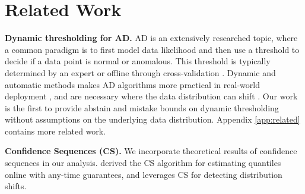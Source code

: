 \section{Related Work}
\vspace{-0.2em}
\textbf{Dynamic thresholding for AD.} AD is an extensively researched topic, where a common paradigm is to first model data likelihood and then use a threshold to decide if a data point is normal or anomalous. This threshold is typically determined by an expert or offline through cross-validation \cite{luo2021deep, schmidl2022anomaly}. Dynamic and automatic methods makes AD algorithms more practical in real-world deployment \cite{ali2013automated, hundman2018detecting}, and are necessary where the data distribution can shift \cite{siffer2017anomaly}.  Our work is the first to provide abstain and mistake bounds on dynamic thresholding without assumptions on the underlying data distribution. Appendix \ref{app:related} contains more related work. %

\textbf{Confidence Sequences (CS).} We incorporate theoretical results of confidence sequences \cite{ramdas2022game} in our analysis. \cite{maharaj2023anytime, howard2022sequential} derived the CS algorithm for estimating quantiles online with any-time guarantees, and \cite{shekhar2023sequential} leverages CS for detecting distribution shifts. 
\vspace{-0.5em}
